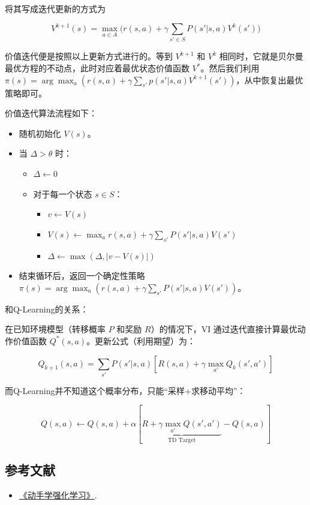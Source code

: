 将其写成迭代更新的方式为

\[
V^{k+1}(s)=\max_{a\in A}\bigl(r(s,a)+\gamma\sum_{s'\in S}P(s'|s,a)V^{k}(s')\bigr)
\]

价值迭代便是按照以上更新方式进行的。等到 \(V^{k+1}\) 和 \(V^{k}\) 相同时，它就是贝尔曼最优方程的不动点，此时对应着最优状态价值函数 \(V^{*}\)。然后我们利用 \(\pi(s)=\arg\max_a(r(s,a)+\gamma\sum_{s'}p(s'|s,a)V^{k+1}(s'))\)，从中恢复出最优策略即可。

价值迭代算法流程如下：

\begin{itemize}
\tightlist
\item
  随机初始化 \(V(s)\)。
\item
{}
  当 \(\Delta>\theta\) 时：

  \begin{itemize}
  \tightlist
  \item
    \(\Delta\leftarrow 0\)
  \item
{}
    对于每一个状态 \(s\in S\)：

    \begin{itemize}
    \tightlist
    \item
      \(v\leftarrow V(s)\)
    \item
      \(V(s)\leftarrow \max_a r(s,a)+\gamma\sum_{s'}P(s'|s,a)V(s')\)
    \item
      \(\Delta\leftarrow \max(\Delta,|v-V(s)|)\)
    \end{itemize}
  \end{itemize}
\item
  结束循环后，返回一个确定性策略 \(\pi(s)=\arg\max_a(r(s,a)+\gamma\sum_{s'}P(s'|s,a)V(s'))\)。
\end{itemize}

和Q-Learning的关系：

在已知环境模型（转移概率 \(P\) 和奖励 \(R\)）的情况下，VI 通过迭代直接计算最优动作价值函数 \(Q^{*}(s,a)\)。更新公式（利用期望）为：

\[
Q_{k+1}(s,a)=\sum_{s'}P(s'|s,a)[R(s,a)+\gamma\max_{a'}Q_k(s',a')]
\]

而Q-Learning并不知道这个概率分布，只能``采样+求移动平均''：

\[
Q(s,a)\leftarrow Q(s,a)+\alpha[\underbrace{R+\gamma\max_{a'}Q(s',a')}_{\text{TD Target}}-Q(s,a)]
\]

\FloatBarrier
{}
\hypertarget{ux53c2ux8003ux6587ux732e-47}{%
\subsection{参考文献}\label{ux53c2ux8003ux6587ux732e-47}}

\vspace{0.25em}
\begin{itemize}
\tightlist
\item
  \href{https://hrl.boyuai.com/}{《动手学强化学习》}.
\end{itemize}

\clearpage
